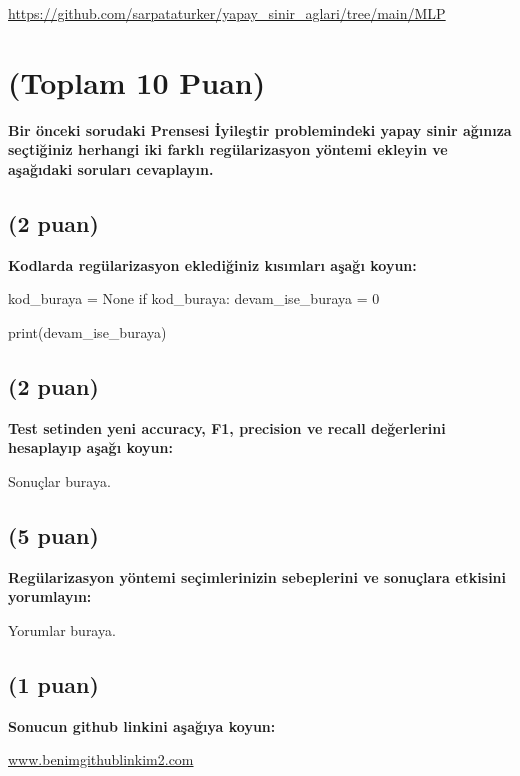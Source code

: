 \documentclass[11pt]{article}
\begin{document}
\url{https://github.com/sarpataturker/yapay_sinir_aglari/tree/main/MLP}
\pagebreak
\section{(Toplam 10 Puan)} \textbf{Bir önceki sorudaki Prensesi İyileştir problemindeki yapay sinir ağınıza seçtiğiniz herhangi iki farklı regülarizasyon yöntemi ekleyin ve aşağıdaki soruları cevaplayın.} 

\subsection{(2 puan)} \textbf{Kodlarda regülarizasyon eklediğiniz kısımları aşağı koyun:} 

\begin{python}
kod_buraya = None
if kod_buraya:
    devam_ise_buraya = 0

print(devam_ise_buraya)
\end{python}

\subsection{(2 puan)} \textbf{Test setinden yeni accuracy, F1, precision ve recall değerlerini hesaplayıp aşağı koyun:}

Sonuçlar buraya.

\subsection{(5 puan)} \textbf{Regülarizasyon yöntemi seçimlerinizin sebeplerini ve sonuçlara etkisini yorumlayın:}

Yorumlar buraya.

\subsection{(1 puan)} \textbf{Sonucun github linkini  aşağıya koyun:}

\url{www.benimgithublinkim2.com}
\end{document}
